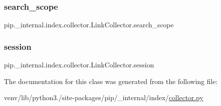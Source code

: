 \subsubsection{\texorpdfstring{search\+\_\+scope}{search\_scope}}
{\footnotesize\ttfamily pip.\+\_\+internal.\+index.\+collector.\+Link\+Collector.\+search\+\_\+scope\hspace{0.3cm}{\ttfamily [static]}}

\mbox{\label{classpip_1_1__internal_1_1index_1_1collector_1_1LinkCollector_aec81e6d9b133b756c0ac7b9293b2951b}} 
\subsubsection{\texorpdfstring{session}{session}}
{\footnotesize\ttfamily pip.\+\_\+internal.\+index.\+collector.\+Link\+Collector.\+session\hspace{0.3cm}{\ttfamily [static]}}



The documentation for this class was generated from the following file\+:\begin{DoxyCompactItemize}
\item 
venv/lib/python3./site-\/packages/pip/\+\_\+internal/index/\hyperlink{collector_8py}{collector.\+py}\end{DoxyCompactItemize}
